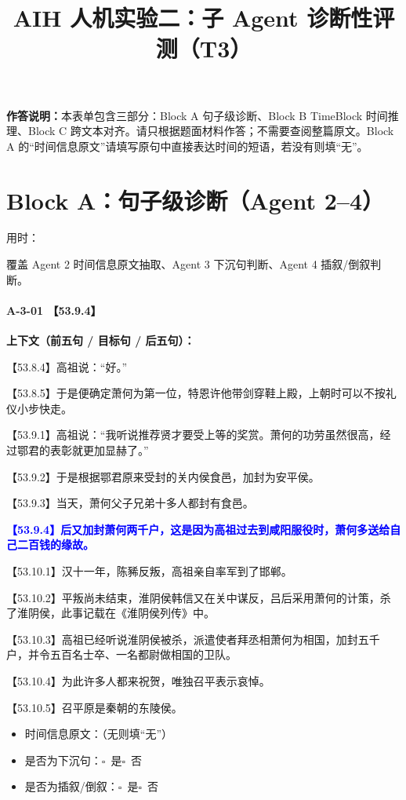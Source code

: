 \documentclass[fontset=none,11pt,a4paper]{ctexart}
\title{\textbf{AIH 人机实验二：子 Agent 诊断性评测（T3）}}
\author{}
\date{}
\newcommand{\answerline}[1]{\underline{\hspace{#1}}}
\newcommand{\choicebox}[1]{$\square$~#1}
\newcommand{\blocktime}{\vspace{0.25em}\noindent 用时：\answerline{4cm}\par\vspace{0.6em}}
\begin{document}
\maketitle
\vspace{-2em}

\textbf{作答说明：}本表单包含三部分：Block A 句子级诊断、Block B TimeBlock 时间推理、Block C 跨文本对齐。请只根据题面材料作答；不需要查阅整篇原文。Block A 的“时间信息原文”请填写原句中直接表达时间的短语，若没有则填“无”。

\section{Block A：句子级诊断（Agent 2--4）}
\blocktime
覆盖 Agent 2 时间信息原文抽取、Agent 3 下沉句判断、Agent 4 插叙/倒叙判断。

\paragraph{A-3-01 \quad 【53.9.4】}
\textbf{上下文（前五句 / 目标句 / 后五句）：}

\noindent 【53.8.4】高祖说：“好。”\par
\noindent 【53.8.5】于是便确定萧何为第一位，特恩许他带剑穿鞋上殿，上朝时可以不按礼仪小步快走。\par
\noindent 【53.9.1】高祖说：“我听说推荐贤才要受上等的奖赏。萧何的功劳虽然很高，经过鄂君的表彰就更加显赫了。”\par
\noindent 【53.9.2】于是根据鄂君原来受封的关内侯食邑，加封为安平侯。\par
\noindent 【53.9.3】当天，萧何父子兄弟十多人都封有食邑。\par
\noindent \textcolor{blue}{\textbf{【53.9.4】后又加封萧何两千户，这是因为高祖过去到咸阳服役时，萧何多送给自己二百钱的缘故。}}\par
\noindent 【53.10.1】汉十一年，陈豨反叛，高祖亲自率军到了邯郸。\par
\noindent 【53.10.2】平叛尚未结束，淮阴侯韩信又在关中谋反，吕后采用萧何的计策，杀了淮阴侯，此事记载在《淮阴侯列传》中。\par
\noindent 【53.10.3】高祖已经听说淮阴侯被杀，派遣使者拜丞相萧何为相国，加封五千户，并令五百名士卒、一名都尉做相国的卫队。\par
\noindent 【53.10.4】为此许多人都来祝贺，唯独召平表示哀悼。\par
\noindent 【53.10.5】召平原是秦朝的东陵侯。\par

\begin{itemize}
  \item 时间信息原文：\answerline{7.5cm}（无则填“无”）
  \item 是否为下沉句：\choicebox{是}\quad \choicebox{否}
  \item 是否为插叙/倒叙：\choicebox{是}\quad \choicebox{否}
\end{itemize}
\end{document}
